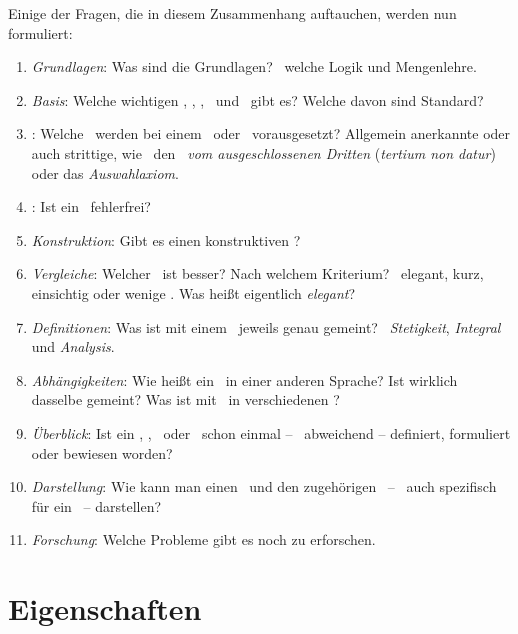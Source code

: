 Einige der Fragen, die in diesem Zusammenhang auftauchen,
werden nun formuliert:
\begin{enumerate}
	\item \label{Frage:Grundlagen} \emph{Grundlagen}:
	Was sind die Grundlagen?
	\textZB\ welche Logik und Mengenlehre.
	\item \label{Frage:Basis} \emph{Basis}:
	Welche wichtigen \Axiome, \Saetze, \Beweise, \Fachbegriffe\ und \Fachgebiete\ gibt es?
	Welche davon sind Standard?
	\item \label{Frage:Axiome} \emph{\Axiome}:
	Welche \Axiome\ werden bei einem \Satz\ oder \Beweis\ vorausgesetzt?
	Allgemein anerkannte oder auch strittige, wie \textzB\ den \emph{\Satz\ vom ausgeschlossenen Dritten} (\emph{tertium non datur}) oder das \emph{Auswahlaxiom}.
	\item \label{Frage:Beweis} \emph{\Beweis}:
	Ist ein \Beweis\ fehlerfrei?
	\item \label{Frage:Konstruktion} \emph{Konstruktion}:
	Gibt es einen konstruktiven \Beweis?
	\item \label{Frage:Vergleiche} \emph{Vergleiche}:
	Welcher \Beweis\ ist besser?
	Nach welchem Kriterium?
	\textZB\ elegant, kurz, einsichtig oder wenige \Axiome.
	Was heißt eigentlich \emph{elegant}?
	\item \label{Frage:Definitionen} \emph{Definitionen}:
	Was ist mit einem \Fachbegriff\ jeweils genau gemeint?
	\textZB\ \emph{Stetigkeit}, \emph{Integral} und \emph{Analysis}.
	\item \label{Frage:Abhängigkeiten} \emph{Abhängigkeiten}:
	Wie heißt ein \Fachbegriff\ in einer anderen Sprache?
	Ist wirklich dasselbe gemeint?
	Was ist mit \Fachbegriffen\ in verschiedenen \Fachgebieten?
	\item \label{Frage:Überblick} \emph{Überblick}:
	Ist ein \Axiom, \Satz, \Beweis\ oder \Fachbegriff\ schon einmal -- \textggf\ abweichend -- definiert, formuliert oder bewiesen worden?
	\item \label{Frage:Darstellung} \emph{Darstellung}:
	Wie kann man einen \Satz\ und den zugehörigen \Beweis\ -- \textggf\ auch spezifisch für ein \Fachgebiet\ -- darstellen?
	\item \label{Frage:Forschung} \emph{Forschung}:
	Welche Probleme gibt es noch zu erforschen.
\end{enumerate}

\section{Eigenschaften}%
\label{sec:Eigenschaften}

